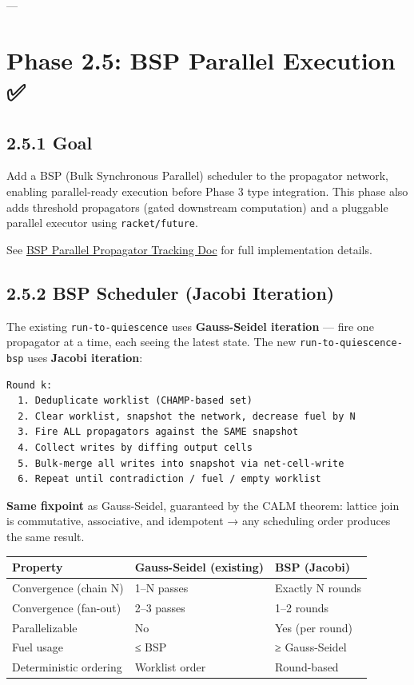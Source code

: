 \documentclass[11pt]{article}
\begin{document}
---
\section{Phase 2.5: BSP Parallel Execution ✅}
\label{sec:org8daa23c}

\subsection{2.5.1 Goal}
\label{sec:org28426fc}

Add a BSP (Bulk Synchronous Parallel) scheduler to the propagator network,
enabling parallel-ready execution before Phase 3 type integration. This
phase also adds threshold propagators (gated downstream computation) and
a pluggable parallel executor using \texttt{racket/future}.

See \href{2026-02-24\_BSP\_PARALLEL\_PROPAGATOR.md}{BSP Parallel Propagator Tracking Doc} for full implementation details.
\subsection{2.5.2 BSP Scheduler (Jacobi Iteration)}
\label{sec:org9c3ad63}

The existing \texttt{run-to-quiescence} uses \textbf{Gauss-Seidel iteration} — fire one
propagator at a time, each seeing the latest state. The new
\texttt{run-to-quiescence-bsp} uses \textbf{Jacobi iteration}:

\begin{verbatim}
Round k:
  1. Deduplicate worklist (CHAMP-based set)
  2. Clear worklist, snapshot the network, decrease fuel by N
  3. Fire ALL propagators against the SAME snapshot
  4. Collect writes by diffing output cells
  5. Bulk-merge all writes into snapshot via net-cell-write
  6. Repeat until contradiction / fuel / empty worklist
\end{verbatim}

\textbf{Same fixpoint} as Gauss-Seidel, guaranteed by the CALM theorem: lattice
join is commutative, associative, and idempotent → any scheduling order
produces the same result.

\begin{center}
\begin{tabular}{lll}
Property & Gauss-Seidel (existing) & BSP (Jacobi)\\
\hline
Convergence (chain N) & 1–N passes & Exactly N rounds\\
Convergence (fan-out) & 2–3 passes & 1–2 rounds\\
Parallelizable & No & Yes (per round)\\
Fuel usage & ≤ BSP & ≥ Gauss-Seidel\\
Deterministic ordering & Worklist order & Round-based\\
\end{tabular}
\end{center}
\end{document}

